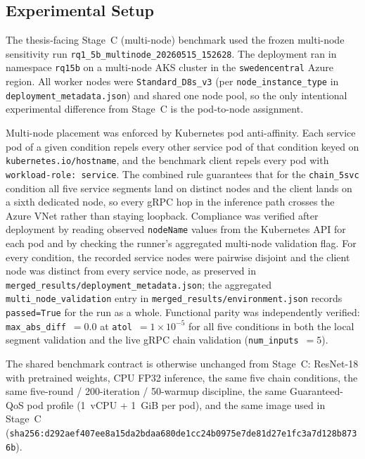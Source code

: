 \subsection{Experimental Setup}

The thesis-facing Stage~C (multi-node) benchmark used the frozen multi-node sensitivity run
\texttt{rq1\_5b\_multinode\_20260515\_152628}. The deployment ran in namespace
\texttt{rq15b} on a multi-node AKS cluster in the \texttt{swedencentral} Azure
region. All worker nodes were \texttt{Standard\_D8s\_v3} (per
\texttt{node\_instance\_type} in \texttt{deployment\_metadata.json}) and shared
one node pool, so the only intentional experimental difference from Stage~C is
the pod-to-node assignment.

Multi-node placement was enforced by Kubernetes pod anti-affinity. Each service pod
of a given condition repels every other service pod of that condition keyed on
\texttt{kubernetes.io/hostname}, and the benchmark client repels every pod with
\texttt{workload-role: service}. The combined rule guarantees that for the
\texttt{chain\_5svc} condition all five service segments land on distinct nodes and
the client lands on a sixth dedicated node, so every gRPC hop in the inference path
crosses the Azure VNet rather than staying loopback. Compliance was verified after
deployment by reading observed \texttt{nodeName} values from the Kubernetes API for
each pod and by checking the runner's aggregated multi-node validation flag. For
every condition, the recorded service nodes were pairwise disjoint and the client
node was distinct from every service node, as preserved in
\texttt{merged\_results/deployment\_metadata.json}; the aggregated
\texttt{multi\_node\_validation} entry in
\texttt{merged\_results/environment.json} records
\texttt{passed=True} for the run as a whole. Functional parity was independently verified:
\texttt{max\_abs\_diff}~$=0.0$ at \texttt{atol}~$=1\times10^{-5}$ for all five
conditions in both the local segment validation and the live gRPC chain validation
(\texttt{num\_inputs}~$=5$).

The shared benchmark contract is otherwise unchanged from Stage~C: ResNet-18 with
pretrained weights, CPU FP32 inference, the same five chain conditions, the same
five-round / 200-iteration / 50-warmup discipline, the same Guaranteed-QoS pod
profile (1~vCPU + 1~GiB per pod), and the same image used in Stage~C
(\texttt{sha256:d292aef407ee8a15da2b}\allowbreak\texttt{daa680de1cc24b0975e7de81d27e1fc3}\allowbreak\texttt{a7d128b8736b}).

